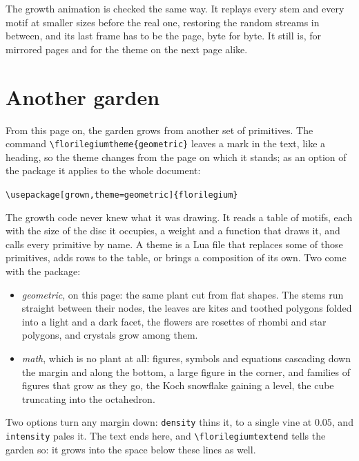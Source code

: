\documentclass[11pt,a4paper,twoside]{article}
\newcommand\code[1]{\texttt{\small #1}}
\theoremstyle{definition}
\begin{document}
The growth animation is checked the same way. It replays every stem and every motif at
smaller sizes before the real one, restoring the random streams in between, and its last
frame has to be the page, byte for byte. It still is, for mirrored pages and for the theme
on the next page alike.

\newpage
{}
\section{Another garden}

From this page on, the garden grows from another set of primitives. The command
\code{\textbackslash florilegiumtheme\{geometric\}} leaves a mark in the text, like a
heading, so the theme changes from the page on which it stands; as an option of the
package it applies to the whole document:
\begin{center}\code{\textbackslash usepackage[grown,theme=geometric]\{florilegium\}}\end{center}

The growth code never knew what it was drawing. It reads a table of motifs, each with the
size of the disc it occupies, a weight and a function that draws it, and calls every
primitive by name. A theme is a Lua file that replaces some of those primitives, adds
rows to the table, or brings a composition of its own. Two come with the package:
\begin{itemize}
\item \emph{geometric}, on this page: the same plant cut from flat shapes. The stems run
straight between their nodes, the leaves are kites and toothed polygons folded into a
light and a dark facet, the flowers are rosettes of rhombi and star polygons, and
crystals grow among them.
\item \emph{math}, which is no plant at all: figures, symbols and equations cascading down
the margin and along the bottom, a large figure in the corner, and families of figures
that grow as they go, the Koch snowflake gaining a level, the cube truncating into the
octahedron.
\end{itemize}
Two options turn any margin down: \code{density} thins it, to a single vine at
$0.05$, and \code{intensity} pales it. The text ends here, and
\code{\textbackslash florilegiumtextend} tells the garden so: it grows into the space below
these lines as well.
\florilegiumtextend
\end{document}

